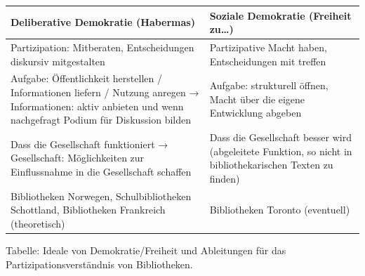 \documentclass[a4paper,
fontsize=11pt,
oneside,
numbers=noperiodatend,
parskip=half-,
bibliography=totoc,
final
]{scrartcl}
\begin{document}
\begin{longtable}[]{@{}ll@{}}
\toprule
\begin{minipage}[b]{0.39\columnwidth}\raggedright
Deliberative Demokratie (Habermas)\strut
\end{minipage} & \begin{minipage}[b]{0.39\columnwidth}\raggedright
Soziale Demokratie (Freiheit zu\ldots{})\strut
\end{minipage}\tabularnewline
\midrule
\endhead
\begin{minipage}[t]{0.39\columnwidth}\raggedright
Partizipation: Mitberaten, Entscheidungen diskursiv mitgestalten\strut
\end{minipage} & \begin{minipage}[t]{0.39\columnwidth}\raggedright
Partizipative Macht haben, Entscheidungen mit treffen\strut
\end{minipage}\tabularnewline
\begin{minipage}[t]{0.39\columnwidth}\raggedright
Aufgabe: Öffentlichkeit herstellen / Informationen liefern / Nutzung
anregen → Informationen: aktiv anbieten und wenn nachgefragt Podium für
Diskussion bilden\strut
\end{minipage} & \begin{minipage}[t]{0.39\columnwidth}\raggedright
Aufgabe: strukturell öffnen, Macht über die eigene Entwicklung
abgeben\strut
\end{minipage}\tabularnewline
\begin{minipage}[t]{0.39\columnwidth}\raggedright
Dass die Gesellschaft funktioniert → Gesellschaft: Möglichkeiten zur
Einflussnahme in die Gesellschaft schaffen\strut
\end{minipage} & \begin{minipage}[t]{0.39\columnwidth}\raggedright
Dass die Gesellschaft besser wird (abgeleitete Funktion, so nicht in
bibliothekarischen Texten zu finden)\strut
\end{minipage}\tabularnewline
\begin{minipage}[t]{0.39\columnwidth}\raggedright
Bibliotheken Norwegen, Schulbibliotheken Schottland, Bibliotheken
Frankreich (theoretisch)\strut
\end{minipage} & \begin{minipage}[t]{0.39\columnwidth}\raggedright
Bibliotheken Toronto (eventuell)\strut
\end{minipage}\tabularnewline
\bottomrule
\end{longtable}

Tabelle: Ideale von Demokratie/Freiheit und Ableitungen für das
Partizipationsverständnis von Bibliotheken.
\end{document}
